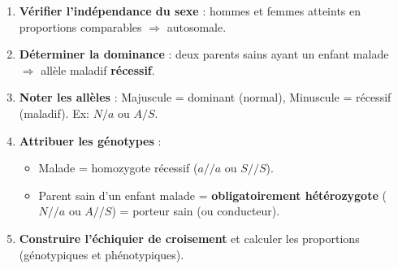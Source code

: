 \documentclass[11pt]{article}
\newcommand{\cle}[1]{{\popxbold\color{popdark}#1}}
\begin{document}
\begin{methode}
\begin{enumerate}
\item \textbf{Vérifier l'indépendance du sexe} : hommes et femmes atteints en proportions comparables $\Rightarrow$ autosomale.
\item \textbf{Déterminer la dominance} : deux parents sains ayant un enfant malade $\Rightarrow$ allèle maladif \textbf{récessif}.
\item \textbf{Noter les allèles} : Majuscule = dominant (normal), Minuscule = récessif (maladif). Ex: $N/a$ ou $A/S$.
\item \textbf{Attribuer les génotypes} :
  \begin{itemize}
  \item Malade = homozygote récessif ($a/\!/a$ ou $S/\!/S$).
  \item Parent sain d'un enfant malade = \textbf{obligatoirement hétérozygote} ($N/\!/a$ ou $A/\!/S$) = \cle{porteur sain} (ou \cle{conducteur}).
  \end{itemize}
\item \textbf{Construire l'échiquier de croisement} et calculer les proportions (génotypiques et phénotypiques).
\end{enumerate}
\end{methode}
\end{document}

